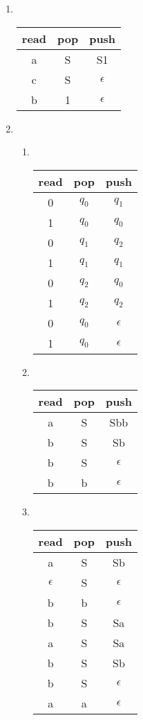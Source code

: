 \documentclass[12pt]{article}
\begin{document}
	\begin{enumerate}
		\item \quad \\%
		\begin{tabular}{c c c}
			read & pop & push \\ \hline
			a & S & S1 \\
			c & S & $\epsilon$ \\
			b & 1 & $\epsilon$
		\end{tabular}
		
		\bigskip
		
		\item %
		\begin{enumerate}
			\item \quad \\ %
			\begin{tabular}{c c c}
				read & pop & push \\ \hline
				0 & $q_0$ & $q_1$ \\
				1 & $q_0$ & $q_0$ \\
				0 & $q_1$ & $q_2$ \\
				1 & $q_1$ & $q_1$ \\
				0 & $q_2$ & $q_0$ \\
				1 & $q_2$ & $q_2$ \\
				0 & $q_0$ & $\epsilon$ \\
				1 & $q_0$ & $\epsilon$
			\end{tabular}
			
			\bigskip
			
			\item \quad \\ %
			\begin{tabular}{c c c}
				read & pop & push \\ \hline
				a & S & Sbb \\
				b & S & Sb \\
				b & S & $\epsilon$ \\
				b & b & $\epsilon$
			\end{tabular}
			
			\bigskip
			
			\item \quad \\ %
			\begin{tabular}{c c c}
				read & pop & push \\ \hline
				a & S & Sb \\
				$\epsilon$ & S & $\epsilon$ \\
				b & b & $\epsilon$ \\
				b & S & Sa \\
				a & S & Sa \\
				b & S & Sb \\
				b & S & $\epsilon$ \\
				a & a & $\epsilon$
			\end{tabular}
			

\end{enumerate}
\end{enumerate}
\end{document}
